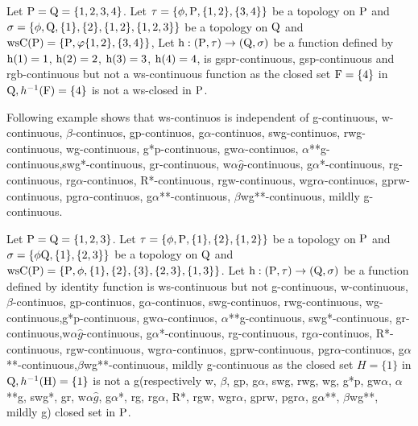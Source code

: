 \begin{exm}\label{exam3.2.10}
Let $\mathrm{P}=\mathrm{Q}= \{1, 2, 3, 4\}$. Let $\tau =\{\phi, \mathrm{P}, \{1,2\}, \{3,4 \}\}$ be a topology on $\mathrm{P}$ and $\sigma =\{\phi, \mathrm{Q}, \{1\}, \{2\}, \{1, 2\},\{1,2,3\}\}$ be a topology on $\mathrm{Q}$ and $\mathrm{ws}\mathrm{C}(\mathrm{P})=\{\mathrm{P}, \varphi \{1,2\}, \{3,4\}\}$, Let $\mathrm{h}: (\mathrm{P}, \tau)\to (\mathrm{Q}, \sigma)$ be a function defined by $\mathrm{h}(1)= 1$, $\mathrm{h}(2)=2$, $\mathrm{h}(3)=3$, $\mathrm{h}(4)=4$, is gspr-continuous, gsp-continuous and rgb-continuous but not a ws-continuous function as the closed set $\mathrm{F}=\{4\}$ in $\mathrm{Q}, h^{-1} (\mathrm{F})=\{4\}$ is not a ws-closed in $\mathrm{P}$.
\end{exm}

\begin{rem}\label{rem3.2.11}
Following example shows that ws-continuos is independent of g-continuous, w-continuous, $\beta$-continuos, gp-continuos, g$\alpha$-continuos, swg-continuos, rwg-continuous, wg-continuous, g*p-continuous, gw$\alpha$-continuos, $\alpha$**g-continuous,\break swg*-continuous, gr-continuous, w$\alpha\hat{g}$-continuous, g$\alpha$*-continuous, rg-continuous, rg$\alpha$-continuos, R*-continuous, rgw-continuous, wgr$\alpha$-continuos, gprw-continuous, pgr$\alpha$-continuos, g$\alpha${*}{*}-continuous, $\beta$wg{*}{*}-continuous, mildly g-continuous.
\end{rem}

\begin{exm}\label{exam3.2.12}
Let $\mathrm{P}= \mathrm{Q} = \{1, 2, 3\}$. Let $\tau = \{\phi, \mathrm{P}, \{1\}, \{2\}, \{1, 2\}\}$ be a topology on $\mathrm{P}$ and $\sigma =\{\phi \mathrm{Q}, \{1\},\{2,3\}\}$ be a topology on $\mathrm{Q}$ and $\mathrm{ws}\mathrm{C}(\mathrm{P})=\{\mathrm{P}, \phi,\{1\}, \{2\}, \{3\},\{2,3\},\{1, 3\}\}$. Let $\mathrm{h}:(\mathrm{P}, \tau)\to (\mathrm{Q}, \sigma)$ be a function defined by identity function is ws-continuous but not g-continuous, w-continuous, $\beta$-continuos, gp-continuos, g$\alpha$-continuos, swg-continuos, rwg-continuous, wg-continuous,\break g*p-continuous, gw$\alpha$-continuos, $\alpha${*}{*}g-continuous, swg*-continuous, gr-continuous,\break w$\alpha\hat{g}$-continuous, g$\alpha$*-continuous, rg-continuous, rg$\alpha$-continuos, R*-continuous, rgw-continuous, wgr$\alpha$-continuos, gprw-continuous, pgr$\alpha$-continuos, g$\alpha${*}{*}-continuous,\break $\beta$wg{*}{*}-continuous, mildly g-continuous as the closed set $H=\{1\}$ in $\mathrm{Q}, h^{-1} (\mathrm{H})=\{1\}$ is not a g(respectively w, $\beta$, gp, g$\alpha$, swg, rwg, wg, g*p, gw$\alpha$, $\alpha$**g, swg*, gr, w$\alpha\hat{g}$, g$\alpha$*, rg, rg$\alpha$, R*, rgw, wgr$\alpha$, gprw, pgr$\alpha$, g$\alpha${*}{*}, $\beta$wg{*}{*}, mildly g) closed set in $\mathrm{P}$.
\end{exm}

